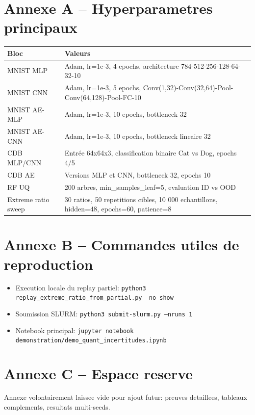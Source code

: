 \documentclass[11pt,a4paper]{article}
\begin{document}
\section{Annexe A -- Hyperparametres principaux}
\begin{longtable}{p{4.2cm}p{10.5cm}}
\toprule
Bloc & Valeurs \\
\midrule
MNIST MLP & Adam, lr=1e-3, 4 epochs, architecture 784-512-256-128-64-32-10 \\
MNIST CNN & Adam, lr=1e-3, 5 epochs, Conv(1,32)-Conv(32,64)-Pool-Conv(64,128)-Pool-FC-10 \\
MNIST AE-MLP & Adam, lr=1e-3, 10 epochs, bottleneck 32 \\
MNIST AE-CNN & Adam, lr=1e-3, 10 epochs, bottleneck lineaire 32 \\
CDB MLP/CNN & Entrée 64x64x3, classification binaire Cat vs Dog, epochs 4/5 \\
CDB AE & Versions MLP et CNN, bottleneck 32, epochs 10 \\
RF UQ & 200 arbres, min\_samples\_leaf=5, evaluation ID vs OOD \\
Extreme ratio sweep & 30 ratios, 50 repetitions cibles, 10 000 echantillons, hidden=48, epochs=60, patience=8 \\
\bottomrule
\end{longtable}

\section{Annexe B -- Commandes utiles de reproduction}
\begin{itemize}[leftmargin=1.2cm]
    \item Execution locale du replay partiel: \texttt{python3 replay\_extreme\_ratio\_from\_partial.py --no-show}
    \item Soumission SLURM: \texttt{python3 submit-slurm.py --nruns 1}
    \item Notebook principal: \texttt{jupyter notebook demonstration/demo\_quant\_incertitudes.ipynb}
\end{itemize}

\section{Annexe C -- Espace reserve}
Annexe volontairement laissee vide pour ajout futur: preuves detaillees, tableaux complements, resultats multi-seeds.
\end{document}
